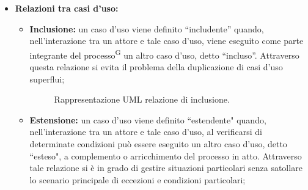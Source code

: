 \documentclass[8pt]{article}
\newcommand{\glossterm}[1]{#1\textsuperscript{G}} %
\begin{document}
\begin{itemize}
\begin{figure}[H]
        \end{figure}
    \item \textbf{Relazioni tra casi d'uso:} 
        \begin{itemize}
        \item \textbf{Inclusione:} un caso d'uso viene definito ``includente'' quando, nell'interazione tra un attore e tale caso d'uso, viene eseguito come parte integrante del \glossterm{processo} un altro caso d'uso, detto ``incluso''. Attraverso questa relazione si evita il problema della duplicazione di casi d'uso superflui; 
            \begin{figure}[H]
                \centering
                \caption{Rappresentazione UML relazione di inclusione.}
                \label{fig:Rappresentazione UML relazione di inclusione}
            \end{figure}
        \item \textbf{Estensione:} un caso d'uso viene definito ``estendente" quando,
            nell'interazione tra un attore e tale caso d'uso, al verificarsi di determinate
                condizioni può essere eseguito un altro caso d'uso, detto ``esteso", a complemento o arricchimento del processo in atto. Attraverso tale relazione si è in grado di gestire situazioni particolari senza satollare lo scenario principale di eccezioni e condizioni particolari;
            \begin{figure}[H]
                \centering
\end{figure}
\end{itemize}
\end{itemize}
\end{document}
